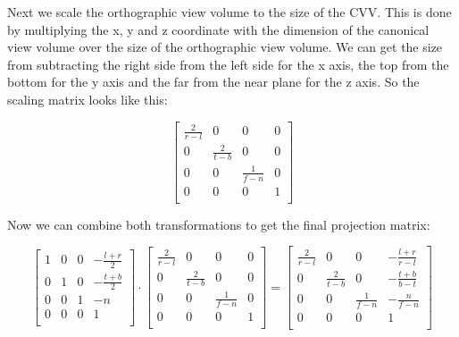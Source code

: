 \documentclass[12pt]{report} \usepackage{preamble}
\begin{document}
Next we scale the orthographic view volume to the size of the CVV.
This is done by multiplying the x, y and z coordinate
with the dimension of the canonical view volume over the size of the orthographic view volume.
We can get the size from subtracting the right side from the left side for the x axis,
the top from the bottom for the y axis and the far from the near plane for the z axis.
So the scaling matrix looks like this:

\[
	\begin{bmatrix}
		\frac{2}{r - l} & 0               & 0               & 0 \\
		0               & \frac{2}{t - b} & 0               & 0 \\
		0               & 0               & \frac{1}{f - n} & 0 \\
		0               & 0               & 0               & 1 \\
	\end{bmatrix}
\]

Now we can combine both transformations to get the final projection matrix:

\[
	\begin{bmatrix}
		1 & 0 & 0 & -\frac{l + r}{2} \\
		0 & 1 & 0 & -\frac{t + b}{2} \\
		0 & 0 & 1 & -n               \\
		0 & 0 & 0 & 1                \\
	\end{bmatrix}
	\cdot
	\begin{bmatrix}
		\frac{2}{r - l} & 0               & 0               & 0 \\
		0               & \frac{2}{t - b} & 0               & 0 \\
		0               & 0               & \frac{1}{f - n} & 0 \\
		0               & 0               & 0               & 1 \\
	\end{bmatrix}
	=
	\begin{bmatrix}
		\frac{2}{r - l} & 0               & 0               & -\frac{l + r}{r - l} \\
		0               & \frac{2}{t - b} & 0               & -\frac{t + b}{b - t} \\
		0               & 0               & \frac{1}{f - n} & -\frac{n}{f - n}     \\
		0               & 0               & 0               & 1                    \\
	\end{bmatrix}
\]
\end{document}

